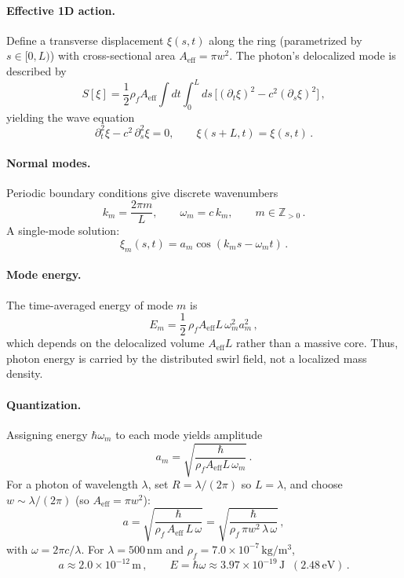 \documentclass[11pt]{article}
\newcommand{\rhof}{\rho_{\!f}}                           %
\begin{document}
\paragraph{Effective 1D action.}
    Define a transverse displacement $\xi(s,t)$ along the ring (parametrized by $s\in[0,L)$) with cross-sectional area $A_{\mathrm{eff}}=\pi w^2$. The photon's delocalized mode is described by
    \[
        S[\xi] = \frac{1}{2}\rhof A_{\mathrm{eff}} \int dt \int_0^L ds\,\Big[(\partial_t \xi)^2 - c^2 (\partial_s \xi)^2\Big]\,,
    \]
    yielding the wave equation
    \[
        \partial_t^2 \xi - c^2\,\partial_s^2 \xi = 0,\qquad \xi(s+L,t) = \xi(s,t)\,.
    \]

\paragraph{Normal modes.}
    Periodic boundary conditions give discrete wavenumbers
    \[
        k_m = \frac{2\pi m}{L},\qquad \omega_m = c\,k_m,\qquad m\in\mathbb{Z}_{>0}\,.
    \]
    A single-mode solution:
    \[
        \xi_m(s,t) = a_m \cos(k_m s - \omega_m t)\,.
    \]

\paragraph{Mode energy.}
    The time-averaged energy of mode $m$ is
    \[
        E_m = \frac{1}{2}\,\rhof A_{\mathrm{eff}} L\,\omega_m^2 a_m^2\,,
    \]
    which depends on the delocalized volume $A_{\mathrm{eff}}L$ rather than a massive core. Thus, photon energy is carried by the distributed swirl field, not a localized mass density.

\paragraph{Quantization.}
    Assigning energy $\hbar \omega_m$ to each mode yields amplitude
    \[
        a_m = \sqrt{\frac{\hbar}{\rhof A_{\mathrm{eff}} L \,\omega_m}}\,.
    \]
    For a photon of wavelength $\lambda$, set $R=\lambda/(2\pi)$ so $L=\lambda$, and choose $w\sim\lambda/(2\pi)$ (so $A_{\mathrm{eff}}=\pi w^2$):
    \[
        a = \sqrt{\frac{\hbar}{\rhof\,A_{\mathrm{eff}} \,L \,\omega}} = \sqrt{\frac{\hbar}{\rhof \,\pi w^2\, \lambda \,\omega}}\,,
    \]
    with $\omega = 2\pi c/\lambda$. For $\lambda = 500\,\mathrm{nm}$ and $\rhof = 7.0 \times 10^{-7}\,\mathrm{kg/m^3}$,
    \[
        a \approx 2.0 \times 10^{-12}\,\mathrm{m}\,, \qquad E = \hbar \omega \approx 3.97 \times 10^{-19}\,\mathrm{J}\;\; (2.48\,\mathrm{eV})\,.
    \]
\end{document}
